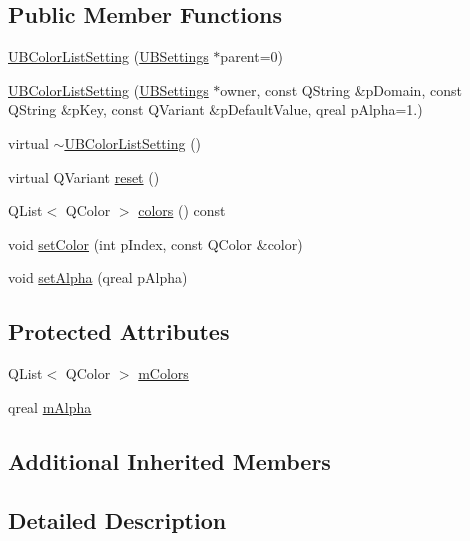 \subsection*{Public Member Functions}
\begin{DoxyCompactItemize}
\item 
\hyperlink{class_u_b_color_list_setting_ae81933a0590ae88de2470925a2c63f2a}{U\-B\-Color\-List\-Setting} (\hyperlink{class_u_b_settings}{U\-B\-Settings} $\ast$parent=0)
\item 
\hyperlink{class_u_b_color_list_setting_a4ca8eaac9d87844717441565bad77126}{U\-B\-Color\-List\-Setting} (\hyperlink{class_u_b_settings}{U\-B\-Settings} $\ast$owner, const Q\-String \&p\-Domain, const Q\-String \&p\-Key, const Q\-Variant \&p\-Default\-Value, qreal p\-Alpha=1.)
\item 
virtual \hyperlink{class_u_b_color_list_setting_a3f3a0c285d196f1458f8a3054793c4db}{$\sim$\-U\-B\-Color\-List\-Setting} ()
\item 
virtual Q\-Variant \hyperlink{class_u_b_color_list_setting_ab64b8dc9b990c58d1776e419944715f9}{reset} ()
\item 
Q\-List$<$ Q\-Color $>$ \hyperlink{class_u_b_color_list_setting_a033ee9638cea8e690183c285fd62ea1f}{colors} () const 
\item 
void \hyperlink{class_u_b_color_list_setting_a0fe42d180ba4ef279b4b0567ee2fc719}{set\-Color} (int p\-Index, const Q\-Color \&color)
\item 
void \hyperlink{class_u_b_color_list_setting_aa066d19edae3dfda0f6e8fa6bacdfbe1}{set\-Alpha} (qreal p\-Alpha)
\end{DoxyCompactItemize}
\subsection*{Protected Attributes}
\begin{DoxyCompactItemize}
\item 
Q\-List$<$ Q\-Color $>$ \hyperlink{class_u_b_color_list_setting_ae030ba8227cd556be337aeb580c4d517}{m\-Colors}
\item 
qreal \hyperlink{class_u_b_color_list_setting_a704825f4ff4430d0c610570bb0d786e2}{m\-Alpha}
\end{DoxyCompactItemize}
\subsection*{Additional Inherited Members}


\subsection{Detailed Description}



